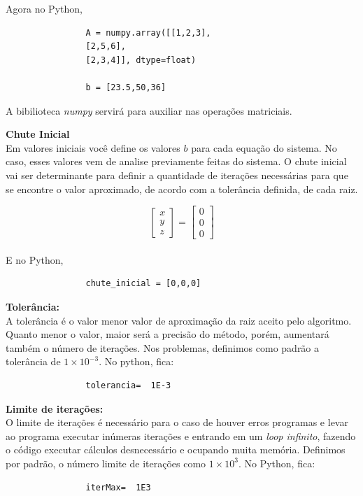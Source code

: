 \documentclass[
12pt,				%
openright,			%
twoside,			%
a4paper,			%
english,			%
french,				%
spanish,			%
brazil				%
]{abntex2_new}
\begin{document}
\begin{alineas}
{				Agora no Python,\\
				
				
				\begin{lstlisting}
				A = numpy.array([[1,2,3],
				[2,5,6],
				[2,3,4]], dtype=float)
				
				b = [23.5,50,36]
				\end{lstlisting}
				A bibilioteca \textit{numpy} servirá para auxiliar nas operações matriciais.
			}
			
			\item{\textbf{Chute Inicial}\\
				Em valores iniciais você define os valores $b$ para cada
				equação do sistema. No caso, esses valores vem de analise previamente feitas do
				sistema. O chute inicial
				vai ser determinante para definir a quantidade de 
				iterações necessárias para que se encontre o valor
				aproximado, de acordo com a tolerância definida, de 
				cada raiz.
				
				$$  \begin{bmatrix}
				x \\
				y \\
				z 
				\end{bmatrix} =
				\begin{bmatrix}
				0 \\
				0 \\
				0
				\end{bmatrix}
				$$\\
				
				E no Python,
				
				\begin{lstlisting}
				chute_inicial = [0,0,0]\end{lstlisting}
				
				
			}
			
			
			
			\item{\textbf{Tolerância:}\\
				A tolerância é o valor menor valor de aproximação da
				raiz aceito pelo algoritmo. Quanto menor o valor, maior
				será a precisão do método, porém, aumentará também o 
				número de iterações. Nos problemas, definimos como padrão
				a tolerância de $1\times10^{-3}$. No python, fica:
				\begin{lstlisting}
				tolerancia=  1E-3\end{lstlisting}
			}
			
			\item{\textbf{Limite de iterações:}\\
				O limite de iterações é necessário para o caso de houver
				erros programas e levar ao programa executar inúmeras iterações
				e entrando em um \textit{loop infinito}, fazendo o código executar cálculos
				desnecessário e ocupando muita memória. Definimos por padrão, o número limite
				de iterações como $1\times 10^{3}$. No Python, fica:
				\begin{lstlisting}
				iterMax=  1E3\end{lstlisting}
				
}
\end{alineas}
\end{document}
